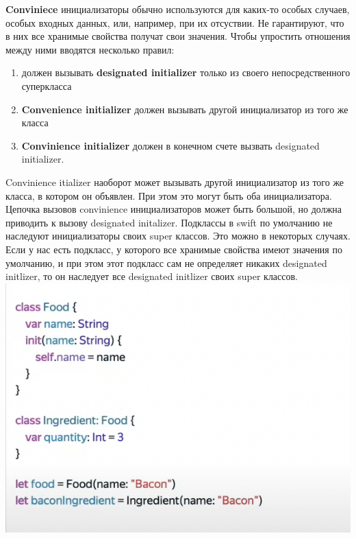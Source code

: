 \documentclass{article}
\begin{document}
    \textbf{Conviniece} инициализаторы обычно используются для каких-то особых случаев, особых входных данных, или, например, при их отсуствии. Не гарантируют, что в них все хранимые свойства получат свои значения. 
    \newline
    Чтобы упростить отношения между ними вводятся несколько правил: 
    \begin{enumerate}
        \item {} должен вызывать \textbf{designated initializer} только из своего непосредственного суперкласса
        \item \textbf{Convenience initializer} должен вызывать другой инициализатор из того же класса
        \item \textbf{Convinience initializer} должен в конечном счете вызвать designated initializer.
    \end{enumerate}
    Convinience itializer наоборот может вызывать другой инициализатор из того же класса, в котором он объявлен. При этом это могут быть оба инициализатора. Цепочка вызовов convinience инициализаторов может быть большой, но должна приводить к вызову designated initalizer.
    \newline
    Подклассы в swift по умолчанию не наследуют инициализаторы своих super классов. Это можно в некоторых случаях. 
    Если у нас есть подкласс, у которого все хранимые свойства имеют значения по умолчанию, и при этом этот подкласс сам не определяет никаких designated initlizer, то он наследует все designated initlizer своих super классов. 
    \newline
    \includegraphics[scale = 0.5]{pic/classInitilizerSwiftAdv.png}
\end{document}
